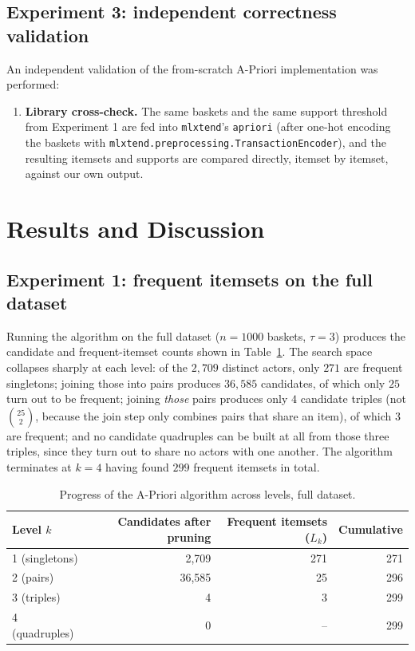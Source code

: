 \documentclass[11pt,a4paper]{article}
\begin{document}
\subsection{Experiment 3: independent correctness validation}

An independent validation of the from-scratch A-Priori implementation was
performed:

\begin{enumerate}
    \item \textbf{Library cross-check.} The same baskets and the same support
    threshold from Experiment 1 are fed into \texttt{mlxtend}'s
    \texttt{apriori} (after one-hot encoding the baskets with
    \texttt{mlxtend.preprocessing.TransactionEncoder}), and the resulting
    itemsets and supports are compared directly, itemset by itemset, against
    our own output.
\end{enumerate}

\section{Results and Discussion}
\label{sec:results}

\subsection{Experiment 1: frequent itemsets on the full dataset}
\label{sec:results-main}

Running the algorithm on the full dataset ($n = 1000$ baskets, $\tau = 3$)
produces the candidate and frequent-itemset counts shown in
Table~\ref{tab:apriori-progress}. The search space collapses sharply at each
level: of the $2{,}709$ distinct actors, only $271$ are frequent singletons;
joining those into pairs produces $36{,}585$ candidates, of which only $25$
turn out to be frequent; joining \emph{those} pairs produces only $4$
candidate triples (not $\binom{25}{2}$, because the join step only combines
pairs that share an item), of which $3$ are frequent; and no candidate
quadruples can be built at all from those three triples, since they turn out
to share no actors with one another. The algorithm terminates at $k=4$ having
found $299$ frequent itemsets in total.

\begin{table}[h]
\centering
\caption{Progress of the A-Priori algorithm across levels, full dataset.}
\label{tab:apriori-progress}
\begin{tabular}{@{}lrrr@{}}
\toprule
Level $k$ & Candidates after pruning & Frequent itemsets ($L_k$) & Cumulative \\
\midrule
1 (singletons) & 2{,}709 & 271 & 271 \\
2 (pairs)      & 36{,}585 & 25  & 296 \\
3 (triples)    & 4        & 3   & 299 \\
4 (quadruples) & 0        & --  & 299 \\
\bottomrule
\end{tabular}
\end{table}
\end{document}
